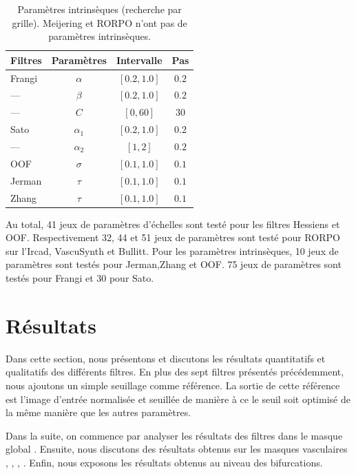\begin{table}[H]
  \caption{Paramètres intrinsèques (recherche par grille). Meijering et RORPO n'ont pas de paramètres intrinsèques.}
  \label{table:PS_interval}
  \begin{center}
    \begin{tabular}{  l  c  c  c }
      \hline
      Filtres & Paramètres & Intervalle & Pas \\
      \hline
      Frangi & $\alpha$ & $[0.2,1.0]$ & $0.2$ \\
      ---       & $\beta$ & $[0.2,1.0]$ & $0.2$  \\
      ---       & $C$& $[0,60]$ & $30$ \\
      Sato & $\alpha_{1}$ & $[0.2,1.0]$ & $0.2$ \\
      ---     & $\alpha_{2}$ & $[1,2]$ & $0.2$ \\
      OOF & $\sigma$ & $[0.1,1.0]$ & $0.1$ \\
      Jerman & $\tau$ & $[0.1,1.0]$ & $0.1$ \\
      Zhang & $\tau$& $[0.1,1.0]$ & $0.1$ \\
      \hline
    \end{tabular}
  \end{center}
\end{table}
  
Au total, 41 jeux de paramètres d'échelles sont testé pour les filtres Hessiens et OOF. Respectivement 32, 44 et 51 jeux de paramètres sont testé pour RORPO sur l'Ircad, VascuSynth et Bullitt. Pour les paramètres intrinsèques, 10 jeux de paramètres sont testés pour Jerman,Zhang et OOF. 75 jeux de paramètres sont testés pour Frangi et 30 pour Sato.


\section{Résultats}

Dans cette section, nous présentons et discutons les résultats quantitatifs et qualitatifs des différents filtres. En plus des sept filtres présentés précédemment, nous ajoutons un simple seuillage comme référence. La sortie de cette référence est l'image d'entrée normalisée et seuillée de manière à ce le seuil soit optimisé de la même manière que les autres paramètres.

Dans la suite, on commence par analyser les résultats des filtres dans le masque global \maskglobal. Ensuite, nous discutons des résultats obtenus sur les masques vasculaires \maskvascular, \maskvesselLarge, \maskvesselMedium, \maskvesselSmall. Enfin, nous exposons les résultats obtenus au niveau des bifurcations.

